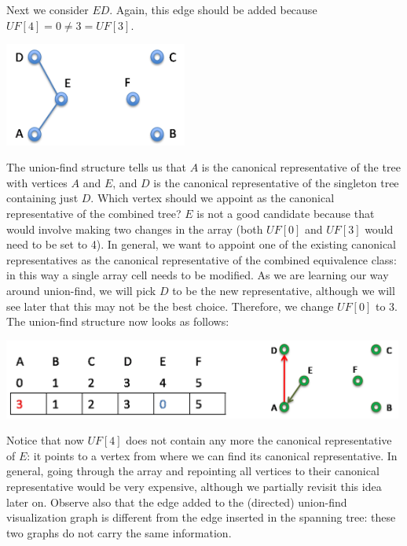 Next we consider $ED$.  Again, this edge should be added because
$\mathit{UF}[4] = 0 \neq 3 = \mathit{UF}[3]$.
\begin{center}
  \includegraphics[width=0.45\textwidth]{img/forest2.png}
\end{center}
The union-find structure tells us that $A$ is the canonical
representative of the tree with vertices $A$ and $E$, and $D$ is the
canonical representative of the singleton tree containing just $D$.
Which vertex should we appoint as the canonical representative of the
combined tree?  $E$ is not a good candidate because that would involve
making two changes in the array (both $\mathit{UF}[0]$ and $\mathit{UF}[3]$ would need
to be set to 4).  In general, we want to appoint one of the existing
canonical representatives as the canonical representative of the
combined equivalence class: in this way a single array cell needs to
be modified.  As we are learning our way around union-find, we will
pick $D$ to be the new representative, although we will see later that
this may not be the best choice.  Therefore, we change $\mathit{UF}[0]$ to 3.
The union-find structure now looks as follows:
\begin{center}
  \includegraphics[width=0.99\textwidth]{img/ufsg2.png}
\end{center}
Notice that now $\mathit{UF}[4]$ does not contain any more the canonical
representative of $E$: it points to a vertex from where we can find
its canonical representative.  In general, going through the array and
repointing all vertices to their canonical representative would be
very expensive, although we partially revisit this idea later on.
Observe also that the edge added to the (directed) union-find
visualization graph is different from the edge inserted in the
spanning tree: these two graphs do not carry the same information.

